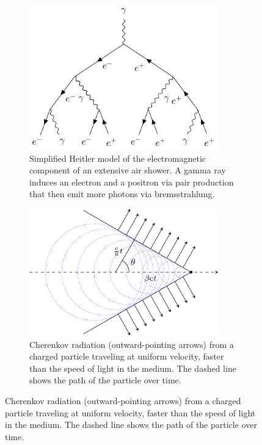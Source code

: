 \begin{figure}
    \begin{subfigure}[t]{0.45\textwidth}
        \centering
        \includegraphics[width=0.90\textwidth]{graphics/heitler_model.pdf}
        \caption{Simplified Heitler model of the electromagnetic component of an extensive air shower.
        A gamma ray induces an electron and a positron via pair production that then emit more photons
        via bremsstrahlung.}
        \label{fig:heitler_model}
    \end{subfigure}
    \hfill
    \begin{subfigure}[t]{0.45\textwidth}
        \centering
        \includegraphics[width=0.90\textwidth]{graphics/cherenkov_radiation.pdf}
        \caption{Cherenkov radiation (outward-pointing arrows) from a charged particle traveling at
        uniform velocity, faster than the speed of light in the medium. The dashed line shows the
        path of the particle over time.}

\end{subfigure}
\end{figure}

